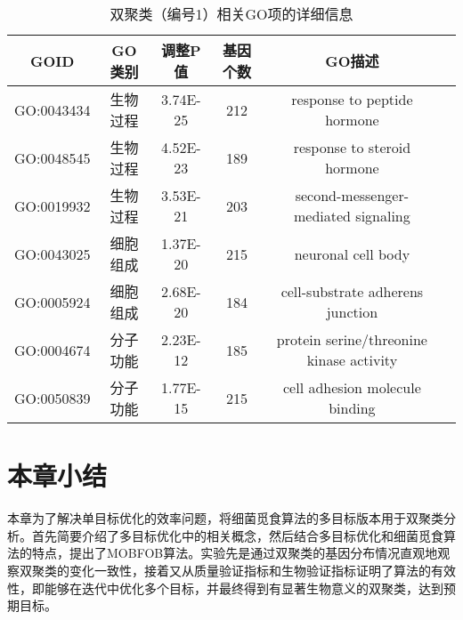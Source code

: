     \begin{table}[htbp]
        \caption{双聚类（编号1）相关GO项的详细信息}\label{tab:go_term}
        \vspace{0.5em}\centering\wuhao
        \begin{tabular}{cccccc}
        \toprule[1.5pt]
        GOID & GO类别 &调整P值 &  基因个数 & GO描述\\
        \midrule[1pt]
        GO:0043434 &生物过程 &3.74E-25& 212& response to peptide hormone \\
        GO:0048545 &生物过程 &4.52E-23& 189& response to steroid hormone \\
        GO:0019932 &生物过程 &3.53E-21& 203& second-messenger-mediated signaling \\
        GO:0043025 &细胞组成 &1.37E-20& 215& neuronal cell body \\
        GO:0005924 &细胞组成 &2.68E-20& 184& cell-substrate adherens junction \\
        GO:0004674 &分子功能 &2.23E-12& 185& protein serine/threonine kinase activity \\
        GO:0050839 &分子功能 &1.77E-15& 215& cell adhesion molecule binding \\
        \bottomrule[1.5pt]
        \end{tabular}
    \end{table}

\section{本章小结}
本章为了解决单目标优化的效率问题，将细菌觅食算法的多目标版本用于双聚类分析。首先简要介绍了多目标优化中的相关概念，然后结合多目标优化和细菌觅食算法的特点，提出了MOBFOB算法。实验先是通过双聚类的基因分布情况直观地观察双聚类的变化一致性，接着又从质量验证指标和生物验证指标证明了算法的有效性，即能够在迭代中优化多个目标，并最终得到有显著生物意义的双聚类，达到预期目标。
